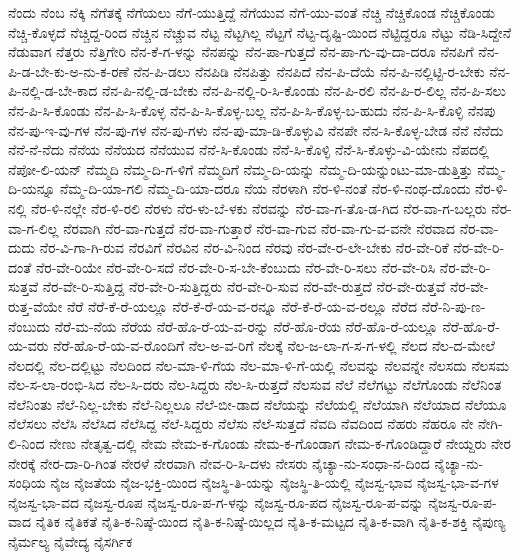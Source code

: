 {ನೆಂದು
ನೆಂಬ
ನೆಕ್ಕಿ
ನೆಗೆತಕ್ಕೆ
ನೆಗೆಯಲು
ನೆಗೆ-ಯುತ್ತಿದ್ದೆ
ನೆಗೆಯುವ
ನೆಗೆ-ಯು-ವಂತೆ
ನೆಚ್ಚಿ
ನೆಚ್ಚಿಕೊಂಡ
ನೆಚ್ಚಿಕೊಂಡು
ನೆಚ್ಚಿ-ಕೊಳ್ಳದೆ
ನೆಚ್ಚಿದ್ದ-ರಿಂದ
ನೆಚ್ಚಿನ
ನೆಚ್ಚುವ
ನೆಟ್ಟ
ನೆಟ್ಟಗಿಲ್ಲ
ನೆಟ್ಟಗೆ
ನೆಟ್ಟ-ದೃಷ್ಟಿ-ಯಿಂದ
ನೆಟ್ಟಿದ್ದರೂ
ನೆಟ್ಟು
ನೆಡಿ-ಸಿದ್ದೇನೆ
ನೆಡುವಾಗ
ನೆತ್ತರು
ನೆತ್ತಿಗೇರಿ
ನೆನ-ಕೆ-ಗ-ಳನ್ನು
ನೆನಪನ್ನು
ನೆನ-ಪಾ-ಗುತ್ತದೆ
ನೆನ-ಪಾ-ಗು-ವು-ದಾ-ದರೂ
ನೆನಪಿಗೆ
ನೆನ-ಪಿ-ಡ-ಬೇ-ಕು-ಅ-ನು-ಕ-ರಣೆ
ನೆನ-ಪಿ-ಡಲು
ನೆನಪಿಡಿ
ನೆನಪಿತ್ತು
ನೆನಪಿದೆ
ನೆನ-ಪಿ-ದೆಯೆ
ನೆನ-ಪಿ-ನಲ್ಲಿಟ್ಟಿ-ರ-ಬೇಕು
ನೆನ-ಪಿ-ನಲ್ಲಿ-ಡ-ಬೇ-ಕಾದ
ನೆನ-ಪಿ-ನಲ್ಲಿ-ಡ-ಬೇಕು
ನೆನ-ಪಿ-ನಲ್ಲಿ-ರಿ-ಸಿ-ಕೊಂಡು
ನೆನ-ಪಿ-ರಲಿ
ನೆನ-ಪಿ-ರ-ಲಿಲ್ಲ
ನೆನ-ಪಿ-ಸಲು
ನೆನ-ಪಿ-ಸಿ-ಕೊಂಡು
ನೆನ-ಪಿ-ಸಿ-ಕೊಳ್ಳ
ನೆನ-ಪಿ-ಸಿ-ಕೊಳ್ಳ-ಬಲ್ಲ
ನೆನ-ಪಿ-ಸಿ-ಕೊಳ್ಳ-ಬ-ಹುದು
ನೆನ-ಪಿ-ಸಿ-ಕೊಳ್ಳಿ
ನೆನಪು
ನೆನ-ಪು-ಇ-ವು-ಗಳ
ನೆನ-ಪು-ಗಳ
ನೆನ-ಪು-ಗಳು
ನೆನ-ಪು-ಮಾ-ಡಿ-ಕೊಳ್ಳುವಿ
ನೆನಪೇ
ನೆನ-ಸಿ-ಕೊಳ್ಳ-ಬೇಡ
ನೆನೆ
ನೆನೆದು
ನೆನೆ-ನೆ-ನೆದು
ನೆನೆಯ
ನೆನೆಯದ
ನೆನೆಯುವ
ನೆನೆ-ಸಿ-ಕೊಂಡು
ನೆನೆ-ಸಿ-ಕೊಳ್ಳಿ
ನೆನೆ-ಸಿ-ಕೊಳ್ಳು-ವಿ-ಯೇನು
ನೆಪದಲ್ಲಿ
ನೆಪೋ-ಲಿ-ಯನ್
ನೆಮ್ಮದಿ
ನೆಮ್ಮ-ದಿ-ಗ-ಳಿಗೆ
ನೆಮ್ಮದಿಗೆ
ನೆಮ್ಮ-ದಿ-ಯನ್ನು
ನೆಮ್ಮ-ದಿ-ಯನ್ನುಂಟು-ಮಾ-ಡುತ್ತಿತ್ತು
ನೆಮ್ಮ-ದಿ-ಯನ್ನೂ
ನೆಮ್ಮ-ದಿ-ಯಾ-ಗಲಿ
ನೆಮ್ಮ-ದಿ-ಯಾ-ದರೂ
ನೆಯ
ನೆರಳಾಗಿ
ನೆರ-ಳಿ-ನಂತೆ
ನೆರ-ಳಿ-ನಂಥ-ದೊಂದು
ನೆರ-ಳಿ-ನಲ್ಲಿ
ನೆರ-ಳಿ-ನಲ್ಲೇ
ನೆರ-ಳಿ-ರಲಿ
ನೆರಳು
ನೆರ-ಳು-ಬೆ-ಳಕು
ನೆರವನ್ನು
ನೆರ-ವಾ-ಗ-ತೊ-ಡ-ಗಿದ
ನೆರ-ವಾ-ಗ-ಬಲ್ಲರು
ನೆರ-ವಾ-ಗ-ಲಿಲ್ಲ
ನೆರವಾಗಿ
ನೆರ-ವಾ-ಗುತ್ತದೆ
ನೆರ-ವಾ-ಗುತ್ತಾರೆ
ನೆರ-ವಾ-ಗುವ
ನೆರ-ವಾ-ಗು-ವ-ವನೇ
ನೆರವಾದ
ನೆರ-ವಾ-ದುದು
ನೆರ-ವಿ-ಗಾ-ಗಿ-ರುವ
ನೆರವಿಗೆ
ನೆರವಿನ
ನೆರ-ವಿ-ನಿಂದ
ನೆರವು
ನೆರ-ವೇ-ರ-ಲೇ-ಬೇಕು
ನೆರ-ವೇ-ರಿಕೆ
ನೆರ-ವೇ-ರಿ-ದಂತೆ
ನೆರ-ವೇ-ರಿಯೇ
ನೆರ-ವೇ-ರಿ-ಸದೆ
ನೆರ-ವೇ-ರಿ-ಸ-ಬೇ-ಕೆಂಬುದು
ನೆರ-ವೇ-ರಿ-ಸಲು
ನೆರ-ವೇ-ರಿಸಿ
ನೆರ-ವೇ-ರಿ-ಸುತ್ತವೆ
ನೆರ-ವೇ-ರಿ-ಸುತ್ತಿದ್ದ
ನೆರ-ವೇ-ರಿ-ಸುತ್ತಿದ್ದರು
ನೆರ-ವೇ-ರಿ-ಸುವ
ನೆರ-ವೇ-ರುತ್ತದೆ
ನೆರ-ವೇ-ರುತ್ತವೆ
ನೆರ-ವೇ-ರುತ್ತ-ವೆಯೇ
ನೆರೆ
ನೆರೆ-ಕೆ-ರೆ-ಯಲ್ಲೂ
ನೆರೆ-ಕೆ-ರೆ-ಯ-ವ-ರನ್ನೂ
ನೆರೆ-ಕೆ-ರೆ-ಯ-ವ-ರಲ್ಲೂ
ನೆರೆದ
ನೆರೆ-ನಿ-ಪು-ಣ-ನೆಂಬುದು
ನೆರೆ-ಮ-ನೆಯ
ನೆರೆಯ
ನೆರೆ-ಹೊ-ರೆ-ಯ-ವ-ರನ್ನು
ನೆರೆ-ಹೊ-ರೆಯ
ನೆರೆ-ಹೊ-ರೆ-ಯಲ್ಲೂ
ನೆರೆ-ಹೊ-ರೆ-ಯ-ವರು
ನೆರೆ-ಹೊ-ರೆ-ಯ-ವ-ರೊಂದಿಗೆ
ನೆಲ-ಅ-ವ-ರಿಗೆ
ನೆಲಕ್ಕೆ
ನೆಲ-ಜ-ಲಾ-ಗ-ಸ-ಗ-ಳಲ್ಲಿ
ನೆಲದ
ನೆಲ-ದ-ಮೇಲೆ
ನೆಲದಲ್ಲಿ
ನೆಲ-ದಲ್ಲಿಟ್ಟು
ನೆಲದಿಂದ
ನೆಲ-ಮಾ-ಳಿ-ಗೆಯ
ನೆಲ-ಮಾ-ಳಿ-ಗೆ-ಯಲ್ಲಿ
ನೆಲವನ್ನು
ನೆಲವನ್ನೇ
ನೆಲಸದು
ನೆಲಸಮ
ನೆಲ-ಸ-ಲಾ-ರಂಭಿ-ಸಿದ
ನೆಲ-ಸಿ-ದರು
ನೆಲ-ಸಿದ್ದರು
ನೆಲ-ಸಿ-ರುತ್ತದೆ
ನೆಲಸುವ
ನೆಲೆ
ನೆಲೆಗಟ್ಟು
ನೆಲೆಗೊಂಡು
ನೆಲೆನಿಂತ
ನೆಲೆನಿಂತು
ನೆಲೆ-ನಿಲ್ಲ-ಬೇಕು
ನೆಲೆ-ನಿಲ್ಲಲೂ
ನೆಲೆ-ಬೀ-ಡಾದ
ನೆಲೆಯನ್ನು
ನೆಲೆಯಲ್ಲಿ
ನೆಲೆಯಾಗಿ
ನೆಲೆಯಾದ
ನೆಲೆಯೂ
ನೆಲೆಸಲು
ನೆಲೆಸಿ
ನೆಲೆಸಿದ
ನೆಲೆಸಿದ್ದ
ನೆಲೆ-ಸಿದ್ದರು
ನೆಲೆಸು
ನೆಲೆ-ಸುತ್ತದೆ
ನೆವದಿ
ನೆವದಿಂದ
ನೆಹರು
ನೆಹರೂ
ನೇ
ನೇಗಿ-ಲಿ-ನಿಂದ
ನೇಣು
ನೇತೃತ್ವ-ದಲ್ಲಿ
ನೇಮ
ನೇಮ-ಕ-ಗೊಂಡು
ನೇಮ-ಕ-ಗೊಂಡಾಗ
ನೇಮ-ಕ-ಗೊಂಡಿದ್ದಾರೆ
ನೇಯ್ದರು
ನೇರ
ನೇರಕ್ಕೆ
ನೇರ-ದಾ-ರಿ-ಗಿಂತ
ನೇರಳೆ
ನೇರವಾಗಿ
ನೇವ-ರಿ-ಸಿ-ದಳು
ನೇಸರು
ನೈಚ್ಯಾ-ನು-ಸಂಧಾ-ನ-ದಿಂದ
ನೈಚ್ಯಾ-ನು-ಸಂಧಿಯ
ನೈಜ
ನೈಜತೆಯ
ನೈಜ-ಭಕ್ತಿ-ಯಿಂದ
ನೈಜಸ್ಥಿ-ತಿ-ಯನ್ನು
ನೈಜಸ್ಥಿ-ತಿ-ಯಲ್ಲಿ
ನೈಜಸ್ವ-ಭಾವ
ನೈಜಸ್ವ-ಭಾ-ವ-ಗಳ
ನೈಜಸ್ವ-ಭಾ-ವದ
ನೈಜಸ್ವ-ರೂಪ
ನೈಜಸ್ವ-ರೂ-ಪ-ಗ-ಳನ್ನು
ನೈಜಸ್ವ-ರೂ-ಪದ
ನೈಜಸ್ವ-ರೂ-ಪ-ವನ್ನು
ನೈಜಸ್ವ-ರೂ-ಪ-ವಾದ
ನೈತಿಕ
ನೈತಿಕತೆ
ನೈತಿ-ಕ-ನಿಷ್ಠೆ-ಯಿಂದ
ನೈತಿ-ಕ-ನಿಷ್ಠೆ-ಯಿಲ್ಲದ
ನೈತಿ-ಕ-ಮಟ್ಟದ
ನೈತಿ-ಕ-ವಾಗಿ
ನೈತಿ-ಕ-ಶಕ್ತಿ
ನೈಪುಣ್ಯ
ನೈರ್ಮಲ್ಯ
ನೈವೇದ್ಯ
ನೈಸರ್ಗಿಕ
}
